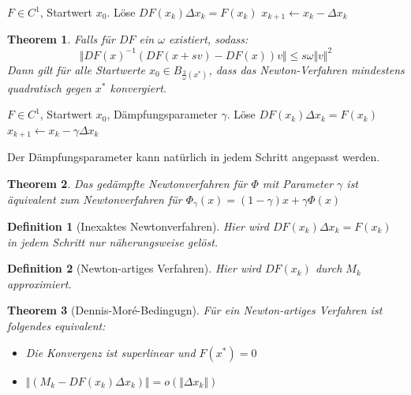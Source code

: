 \documentclass[10pt,a4paper]{article}
\newtheorem{theorem}{Theorem}
\newtheorem{definition}{Definition}
\begin{document}
	\begin{algorithm}
		\caption{Newton-Verfahren}
		\begin{algorithmic}
			\Require $F\in C^1$, Startwert $x_0$.
			\State Löse $DF(x_k)\Delta x_k = F(x_k)$
			\State $x_{k+1} \leftarrow x_k - \Delta x_k$
			\EndFor
		\end{algorithmic}
	\end{algorithm}
	\begin{theorem}
		Falls für $DF$ ein $\omega$ existiert, sodass:
		$$\Vert DF(x)^{-1}(DF(x+sv)- DF(x))v\Vert \leq s\omega\Vert v\Vert^2$$
		Dann gilt für alle Startwerte $x_0 \in B_{\frac{2}{\omega}(x^*)}$, dass das Newton-Verfahren mindestens quadratisch gegen $x^*$ konvergiert.
	\end{theorem}
	\begin{algorithm}[H]
		\caption{gedämpftes Newton-Verfahren}
		\begin{algorithmic}
		
			\Require $F\in C^1$, Startwert $x_0$, Dämpfungsparameter $\gamma$.
			\For{$k=0, 1, ...$}
			\State Löse $DF(x_k)\Delta x_k = F(x_k)$
			\State $x_{k+1} \leftarrow x_k - \gamma\Delta x_k$
			\EndFor
		\end{algorithmic}
	\end{algorithm}
	Der Dämpfungsparameter kann natürlich in jedem Schritt angepasst werden.
	\begin{theorem}
		Das gedämpfte Newtonverfahren für $\Phi$ mit Parameter $\gamma$ ist äquivalent zum Newtonverfahren für $\Phi_\gamma(x) = (1-\gamma)x + \gamma \Phi(x)$ 
	\end{theorem}
	\begin{definition}[Inexaktes Newtonverfahren]
		Hier wird $DF(x_k)\Delta x_k = F(x_k)$ in jedem Schritt nur näherungsweise gelöst.
	\end{definition}
	\begin{definition}[Newton-artiges Verfahren]
		Hier wird $DF(x_k)$ durch $M_k$ approximiert.
	\end{definition}
	\begin{theorem}[Dennis-Moré-Bedingugn]
		Für ein Newton-artiges Verfahren ist folgendes equivalent:
		\begin{itemize}
			\item Die Konvergenz ist superlinear und $F(x^*) = 0$
			\item $\Vert (M_k - DF(x_k)\Delta x_k )\Vert = o(\Vert \Delta x_k \Vert)$
		\end{itemize}
	\end{theorem}
\end{document}
